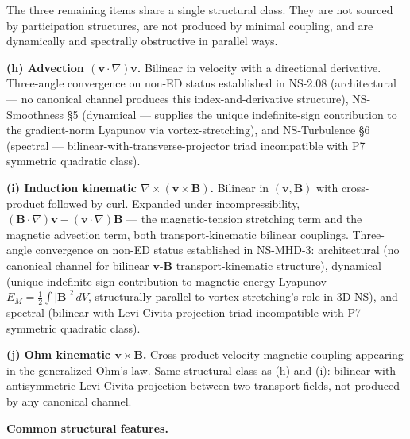 \documentclass[
]{article}
\begin{document}
The three remaining items share a single structural class. They are not
sourced by participation structures, are not produced by minimal
coupling, and are dynamically and spectrally obstructive in parallel
ways.

\textbf{(h) Advection \((\mathbf{v}\cdot\nabla)\mathbf{v}\).} Bilinear
in velocity with a directional derivative. Three-angle convergence on
non-ED status established in NS-2.08 (architectural --- no canonical
channel produces this index-and-derivative structure), NS-Smoothness §5
(dynamical --- supplies the unique indefinite-sign contribution to the
gradient-norm Lyapunov via vortex-stretching), and NS-Turbulence §6
(spectral --- bilinear-with-transverse-projector triad incompatible with
P7 symmetric quadratic class).

\textbf{(i) Induction kinematic
\(\nabla\times(\mathbf{v}\times\mathbf{B})\).} Bilinear in
\((\mathbf{v},\mathbf{B})\) with cross-product followed by curl.
Expanded under incompressibility,
\((\mathbf{B}\cdot\nabla)\mathbf{v} - (\mathbf{v}\cdot\nabla)\mathbf{B}\)
--- the magnetic-tension stretching term and the magnetic advection
term, both transport-kinematic bilinear couplings. Three-angle
convergence on non-ED status established in NS-MHD-3: architectural (no
canonical channel for bilinear \(\mathbf{v}\)-\(\mathbf{B}\)
transport-kinematic structure), dynamical (unique indefinite-sign
contribution to magnetic-energy Lyapunov
\(E_M = \tfrac{1}{2}\int|\mathbf{B}|^2\,dV\), structurally parallel to
vortex-stretching's role in 3D NS), and spectral
(bilinear-with-Levi-Civita-projection triad incompatible with P7
symmetric quadratic class).

\textbf{(j) Ohm kinematic \(\mathbf{v}\times\mathbf{B}\).} Cross-product
velocity-magnetic coupling appearing in the generalized Ohm's law. Same
structural class as (h) and (i): bilinear with antisymmetric Levi-Civita
projection between two transport fields, not produced by any canonical
channel.

\textbf{Common structural features.}
\end{document}
